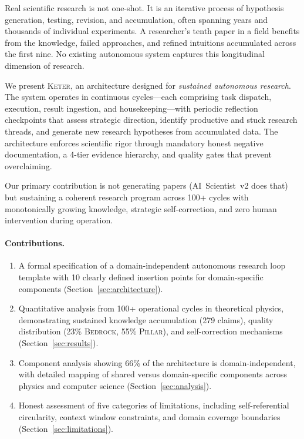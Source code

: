 \documentclass[11pt,a4paper]{article}
\newcommand{\keter}{\textsc{Keter}}
\newcommand{\bedrock}{\textsc{Bedrock}}
\newcommand{\pillar}{\textsc{Pillar}}
\begin{document}
Real scientific research is not one-shot. It is an iterative process of hypothesis
generation, testing, revision, and accumulation, often spanning years and thousands
of individual experiments. A researcher's tenth paper in a field benefits from the
knowledge, failed approaches, and refined intuitions accumulated across the first
nine. No existing autonomous system captures this longitudinal dimension of research.

We present \keter{}, an architecture designed for \emph{sustained autonomous research}.
The system operates in continuous cycles---each comprising task dispatch, execution,
result ingestion, and housekeeping---with periodic reflection checkpoints that assess
strategic direction, identify productive and stuck research threads, and generate
new research hypotheses from accumulated data. The architecture enforces scientific
rigor through mandatory honest negative documentation, a 4-tier evidence hierarchy,
and quality gates that prevent overclaiming.

Our primary contribution is not generating papers (AI~Scientist~v2 does that) but
sustaining a coherent research program across 100+ cycles with monotonically growing
knowledge, strategic self-correction, and zero human intervention during operation.

\paragraph{Contributions.}
\begin{enumerate}[nosep]
    \item A formal specification of a domain-independent autonomous research loop
          template with 10 clearly defined insertion points for domain-specific
          components (Section~\ref{sec:architecture}).
    \item Quantitative analysis from 100+ operational cycles in theoretical physics,
          demonstrating sustained knowledge accumulation (279 claims), quality
          distribution (23\% \bedrock{}, 55\% \pillar{}), and self-correction
          mechanisms (Section~\ref{sec:results}).
    \item Component analysis showing 66\% of the architecture is domain-independent,
          with detailed mapping of shared versus domain-specific components across
          physics and computer science (Section~\ref{sec:analysis}).
    \item Honest assessment of five categories of limitations, including self-referential
          circularity, context window constraints, and domain coverage boundaries
          (Section~\ref{sec:limitations}).
\end{enumerate}
\end{document}
